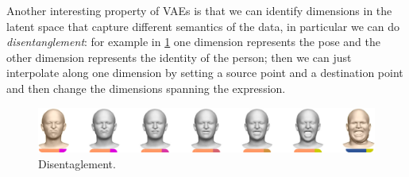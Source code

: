 Another interesting property of VAEs is that we can identify dimensions in the latent space that capture different semantics of the data, in particular we can do \emph{disentanglement}: for example in \cref{fig:disentanglement} one dimension represents the pose and the other dimension represents the identity of the person; then we can just interpolate along one dimension by setting a source point and a destination point and then change the dimensions spanning the expression. 

\begin{figure}[H]
	\centering
	\includegraphics[width=.5\textwidth]{figures/11/faces3d.png}
	\caption{Disentaglement.}\label{fig:disentanglement}	
\end{figure}
